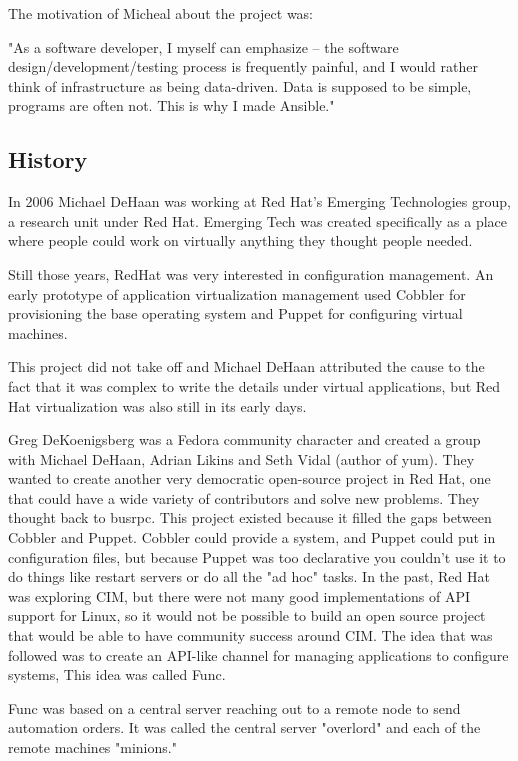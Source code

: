 \documentclass[12pt,a4paper,openright,twoside]{book}
\begin{document}
The motivation of Micheal about the project was:


"As a software developer, I myself can emphasize -- the software design/development/testing process is frequently painful, and I would rather think of infrastructure as being data-driven. Data is supposed to be simple, programs are often not. This is why I made Ansible."

\subsection{History}
In 2006 Michael DeHaan was working at Red Hat's Emerging Technologies group, a research unit under Red Hat. Emerging Tech was created specifically as a place where people could work on virtually anything they thought people needed.


Still those years, RedHat was very interested in configuration management. An early prototype of application virtualization management used Cobbler for provisioning the base operating system and Puppet for configuring virtual machines.


This project did not take off and Michael DeHaan attributed the cause to the fact that it was complex to write the details under virtual applications, but Red Hat virtualization was also still in its early days.


Greg DeKoenigsberg was a Fedora community character and created a group with Michael DeHaan, Adrian Likins and Seth Vidal (author of yum). They wanted to create another very democratic open-source project in Red Hat, one that could have a wide variety of contributors and solve new problems. They thought back to busrpc. This project existed because it filled the gaps between Cobbler and Puppet. Cobbler could provide a system, and Puppet could put in configuration files, but because Puppet was too declarative you couldn't use it to do things like restart servers or do all the "ad hoc" tasks. In the past, Red Hat was exploring CIM, but there were not many good implementations of API support for Linux, so it would not be possible to build an open source project that would be able to have community success around CIM. The idea that was followed was to create an API-like channel for managing applications to configure systems, This idea was called Func.


Func was based on a central server reaching out to a remote node to send automation orders. It was called the central server "overlord" and each of the remote machines "minions." 
\end{document}
